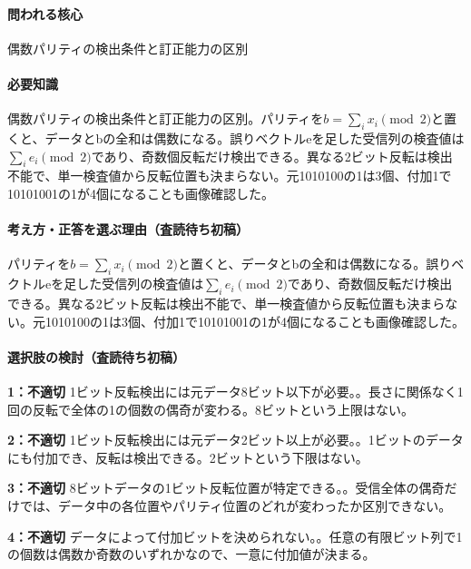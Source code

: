 \paragraph{問われる核心} 偶数パリティの検出条件と訂正能力の区別

\paragraph{必要知識} 偶数パリティの検出条件と訂正能力の区別。パリティを\(b=\sum_ix_i\pmod2\)と置くと、データとbの全和は偶数になる。誤りベクトルeを足した受信列の検査値は\(\sum_ie_i\pmod2\)であり、奇数個反転だけ検出できる。異なる2ビット反転は検出不能で、単一検査値から反転位置も決まらない。元1010100の1は3個、付加1で10101001の1が4個になることも画像確認した。

\paragraph{考え方・正答を選ぶ理由（査読待ち初稿）} パリティを\(b=\sum_ix_i\pmod2\)と置くと、データとbの全和は偶数になる。誤りベクトルeを足した受信列の検査値は\(\sum_ie_i\pmod2\)であり、奇数個反転だけ検出できる。異なる2ビット反転は検出不能で、単一検査値から反転位置も決まらない。元1010100の1は3個、付加1で10101001の1が4個になることも画像確認した。

\paragraph{選択肢の検討（査読待ち初稿）}\mbox{}\par

\noindent\textbf{1：不適切} 1ビット反転検出には元データ8ビット以下が必要。。長さに関係なく1回の反転で全体の1の個数の偶奇が変わる。8ビットという上限はない。\par

\noindent\textbf{2：不適切} 1ビット反転検出には元データ2ビット以上が必要。。1ビットのデータにも付加でき、反転は検出できる。2ビットという下限はない。\par

\noindent\textbf{3：不適切} 8ビットデータの1ビット反転位置が特定できる。。受信全体の偶奇だけでは、データ中の各位置やパリティ位置のどれが変わったか区別できない。\par

\noindent\textbf{4：不適切} データによって付加ビットを決められない。。任意の有限ビット列で1の個数は偶数か奇数のいずれかなので、一意に付加値が決まる。\par

